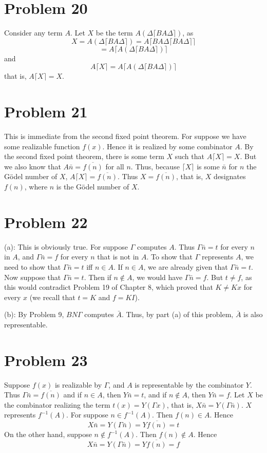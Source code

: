 \documentclass{article}
\theoremstyle{definition}
\begin{document}
\section*{Problem 20}
Consider any term $A$. Let $X$ be the term $A(\Delta\bigl \lceil BA\Delta\bigr \rceil)$, as
\[ X=A(\Delta\bigl \lceil BA\Delta\bigr \rceil)=A\bigl \lceil BA\Delta\bigl \lceil BA\Delta\bigr \rceil\bigr \rceil \] 
\[ =A\bigl \lceil A(\Delta\bigl\lceil BA\Delta\bigr\rceil )\bigr\rceil \] and
\[ A\bigl \lceil X\bigr \rceil=A\bigl \lceil A(\Delta\bigl \lceil BA\Delta\bigr \rceil)\bigr \rceil \]
that is, $A\bigl \lceil X\bigr \rceil =X$.

\section*{Problem 21}
This is immediate from the second fixed point theorem. For suppose we have some realizable function $f(x)$. Hence it is realized by some combinator $A$. 
By the second fixed point theorem, there is some term $X$ such that $A\bigl \lceil X\bigr \rceil =X$. But we also know that $A\bar{n}=\overline{f(n)}$ for all $n$. Thus, because
$\bigl \lceil X\bigr \rceil$ is some $\bar{n}$ for $n$ the Gödel number of $X$, $A\bigl \lceil X\bigr \rceil=\overline{f(n)}$. Thus $X=\overline{f(n)}$, that is, $X$ designates $f(n)$, where $n$ is the Gödel number of $X$. 

\section*{Problem 22}
(a): This is obviously true. For suppose $\Gamma$ computes $A$. Thus $\Gamma\bar{n}=t$ for every $n$ in $A$, and $\Gamma\bar{n}=f$ for every $n$ that is not in $A$. To show that 
$\Gamma$ represents $A$, we need to show that $\Gamma\bar{n}=t$ iff $n\in A$. If $n\in A$, we are already given that $\Gamma\bar{n}=t$. Now suppose that $\Gamma\bar{n}=t$. Then if 
$n\notin A$, we would have $\Gamma\bar{n}=f$. But $t\ne f$, as this would contradict Problem 19 of Chapter 8, which proved that $K\ne Kx$ for every $x$ (we recall that $t=K$ and $f=KI$).


(b): By Problem 9, $BN\Gamma$ computes $\bar{A}$. Thus, by part (a) of this problem, $\bar{A}$ is also representable.

\section*{Problem 23}
Suppose $f(x)$ is realizable by $\Gamma$, and $A$ is representable by the combinator $Y$. Thus $\Gamma\bar{n}=\overline{f(n)}$ and 
if $n\in A$, then $Y\bar{n}=t$, and if $n\notin A$, then $Y\bar{n}=f$. Let $X$ be the combinator realizing the term $t(x)=Y(\Gamma x)$, that is, 
$X\bar{n}=Y(\Gamma\bar{n})$. $X$ represents $f^{-1}(A)$. For suppose $n\in f^{-1}(A)$. Then $f(n)\in A$. Hence 
\[ X\bar{n}=Y(\Gamma\bar{n})=Y\overline{f(n)}=t \] On the other hand, suppose $n\notin f^{-1}(A)$. Then $f(n)\notin A$. Hence
\[ X\bar{n}=Y(\Gamma\bar{n})=Y\overline{f(n)}=f \]
\end{document}
